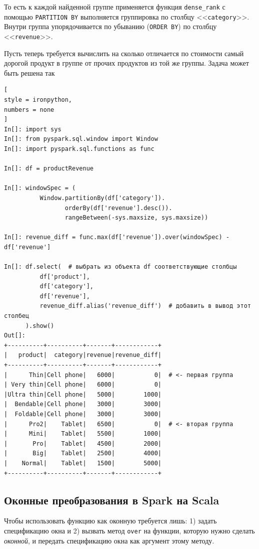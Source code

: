 \documentclass[%
	11pt,
	a4paper,
	utf8,
		]{article}
\begin{document}
То есть к каждой найденной группе применяется функция \texttt{dense\_rank} с помощью \texttt{PARTITION BY} выполняется группировка по столбцу <<\texttt{category}>>. Внутри группа упорядочивается по убыванию (\texttt{ORDER BY}) по столбцу <<\texttt{revenue}>>.

Пусть теперь требуется вычислить на сколько отличается по стоимости самый дорогой продукт в группе от прочих продуктов из той же группы. Задача может быть решена так

\begin{lstlisting}[
style = ironpython,
numbers = none
]
In[]: import sys
In[]: from pyspark.sql.window import Window
In[]: import pyspark.sql.functions as func

In[]: df = productRevenue

In[]: windowSpec = (
          Window.partitionBy(df['category']).
                 orderBy(df['revenue'].desc()).
                 rangeBetween(-sys.maxsize, sys.maxsize))
                 
In[]: revenue_diff = func.max(df['revenue']).over(windowSpec) - df['revenue']

In[]: df.select(  # выбрать из объекта df соответствующие столбцы
          df['product'],
          df['category'],
          df['revenue'],
          revenue_diff.alias('revenue_diff')  # добавить в вывод этот столбец
      ).show()
Out[]:
+----------+----------+-------+------------+
|   product|  category|revenue|revenue_diff|
+----------+----------+-------+------------+
|      Thin|Cell phone|   6000|           0|  # <- первая группа
| Very thin|Cell phone|   6000|           0|
|Ultra thin|Cell phone|   5000|        1000|
|  Bendable|Cell phone|   3000|        3000|
|  Foldable|Cell phone|   3000|        3000|
|      Pro2|    Tablet|   6500|           0|  # <- вторая группа
|      Mini|    Tablet|   5500|        1000|
|       Pro|    Tablet|   4500|        2000|
|       Big|    Tablet|   2500|        4000|
|    Normal|    Tablet|   1500|        5000|
+----------+----------+-------+------------+
\end{lstlisting}

\subsection{Оконные преобразования в Spark на Scala}

Чтобы использовать функцию как оконную требуется лишь: 1) задать спецификацию окна  и 2) вызвать метод \texttt{over} на функции, которую нужно сделать \emph{оконной}, и передать спецификацию окна как аргумент этому методу.
\end{document}
